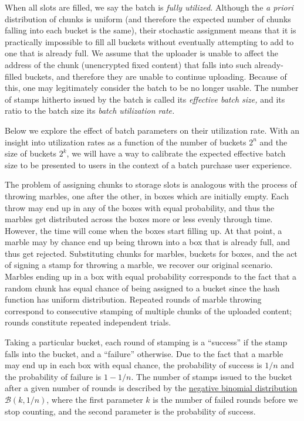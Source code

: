 \documentclass[
  letterpaper,
  DIV=11,
  numbers=noendperiod]{scrartcl}
\begin{document}
When all slots are filled, we say the batch is \emph{fully utilized.}
Although the \emph{a priori} distribution of chunks is uniform (and
therefore the expected number of chunks falling into each bucket is the
same), their stochastic assignment means that it is practically
impossible to fill all buckets without eventually attempting to add to
one that is already full. We assume that the uploader is unable to
affect the address of the chunk (unencrypted fixed content) that falls
into such already-filled buckets, and therefore they are unable to
continue uploading. Because of this, one may legitimately consider the
batch to be no longer usable. The number of stamps hitherto issued by
the batch is called its \emph{effective batch size,} and its ratio to
the batch size its \emph{batch utilization rate.}

Below we explore the effect of batch parameters on their utilization
rate. With an insight into utilization rates as a function of the number
of buckets $2^n$ and the size of buckets $2^k$, we will have a way
to calibrate the expected effective batch size to be presented to users
in the context of a batch purchase user experience.

The problem of assigning chunks to storage slots is analogous with the
process of throwing marbles, one after the other, in boxes which are
initially empty. Each throw may end up in any of the boxes with equal
probability, and thus the marbles get distributed across the boxes more
or less evenly through time. However, the time will come when the boxes
start filling up. At that point, a marble may by chance end up being
thrown into a box that is already full, and thus get rejected.
Substituting chunks for marbles, buckets for boxes, and the act of
signing a stamp for throwing a marble, we recover our original scenario.
Marbles ending up in a box with equal probability corresponds to the
fact that a random chunk has equal chance of being assigned to a bucket
since the hash function has uniform distribution. Repeated rounds of
marble throwing correspond to consecutive stamping of multiple chunks of
the uploaded content; rounds constitute repeated independent trials.

Taking a particular bucket, each round of stamping is a ``success'' if
the stamp falls into the bucket, and a ``failure'' otherwise. Due to the
fact that a marble may end up in each box with equal chance, the
probability of success is $1/n$ and the probability of failure is
$1 - 1/n$. The number of stamps issued to the bucket after a given
number of rounds is described by the
\href{https://en.wikipedia.org/wiki/Negative_binomial_distribution\#Distribution_of_a_sum_of_geometrically_distributed_random_variables}{negative
binomial distribution} $\mathcal{B}(k, 1/n)$, where the first
parameter $k$ is the number of failed rounds before we stop counting,
and the second parameter is the probability of success.
\end{document}

